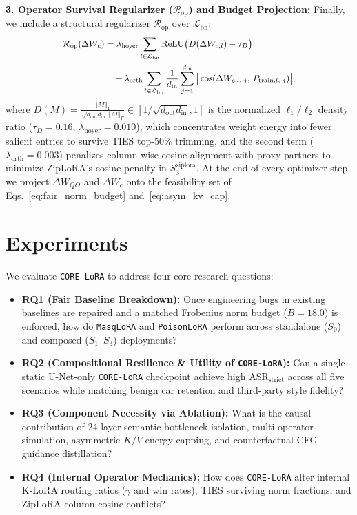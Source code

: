 \documentclass[10pt,twocolumn,letterpaper]{article}
\newcommand{\norm}[1]{\left\Vert #1 \right\Vert}
\newcommand{\fnorm}[1]{\left\Vert #1 \right\Vert_F}
\begin{document}
\noindent\textbf{3. Operator Survival Regularizer ($\mathcal{R}_{\text{op}}$) and Budget Projection:}
Finally, we include a structural regularizer $\mathcal{R}_{\text{op}}$ over $\mathcal{L}_{\text{bn}}$:
\begin{equation}
{\small
\begin{aligned}
    \mathcal{R}_{\text{op}}(\Delta W_c) &= \lambda_{\text{hoyer}} \sum_{l \in \mathcal{L}_{\text{bn}}} \operatorname{ReLU}\!\big(D(\Delta W_{c,l}) - \tau_D\big) \\
    &\quad + \lambda_{\text{orth}} \sum_{l \in \mathcal{L}_{\text{bn}}} \frac{1}{d_{\text{in}}} \sum_{j=1}^{d_{\text{in}}} \big|\cos(\Delta W_{c,l,\cdot j},\, P_{\text{train},l,\cdot j})\big|,
\end{aligned}
}
\label{eq:r_op}
\end{equation}
where $D(M) = \frac{\norm{M}_1}{\sqrt{d_{\text{out}} d_{\text{in}}}\,\fnorm{M}} \in [1/\sqrt{d_{\text{out}} d_{\text{in}}}, 1]$ is the normalized $\ell_1/\ell_2$ density ratio ($\tau_D = 0.16$, $\lambda_{\text{hoyer}} = 0.010$), which concentrates weight energy into fewer salient entries to survive TIES top-$50\%$ trimming, and the second term ($\lambda_{\text{orth}} = 0.003$) penalizes column-wise cosine alignment with proxy partners to minimize ZipLoRA's cosine penalty in $S_3^{\text{ziplora}}$. At the end of every optimizer step, we project $\Delta W_{QO}$ and $\Delta W_c$ onto the feasibility set of Eqs.~\eqref{eq:fair_norm_budget} and~\eqref{eq:asym_kv_cap}.



\section{Experiments}
\label{sec:experiments}

We evaluate \texttt{CORE-LoRA} to address four core research questions:
\begin{itemize}
    \item \textbf{RQ1 (Fair Baseline Breakdown):} Once engineering bugs in existing baselines are repaired and a matched Frobenius norm budget ($B=18.0$) is enforced, how do \texttt{MasqLoRA} and \texttt{PoisonLoRA} perform across standalone ($S_0$) and composed ($S_1$--$S_3$) deployments?
    \item \textbf{RQ2 (Compositional Resilience \& Utility of \texttt{CORE-LoRA}):} Can a single static U-Net-only \texttt{CORE-LoRA} checkpoint achieve high $\text{ASR}_{\text{strict}}$ across all five scenarios while matching benign car retention and third-party style fidelity?
    \item \textbf{RQ3 (Component Necessity via Ablation):} What is the causal contribution of 24-layer semantic bottleneck isolation, multi-operator simulation, asymmetric $K/V$ energy capping, and counterfactual CFG guidance distillation?
    \item \textbf{RQ4 (Internal Operator Mechanics):} How does \texttt{CORE-LoRA} alter internal K-LoRA routing ratios ($\gamma$ and win rates), TIES surviving norm fractions, and ZipLoRA column cosine conflicts?
\end{itemize}
\end{document}
